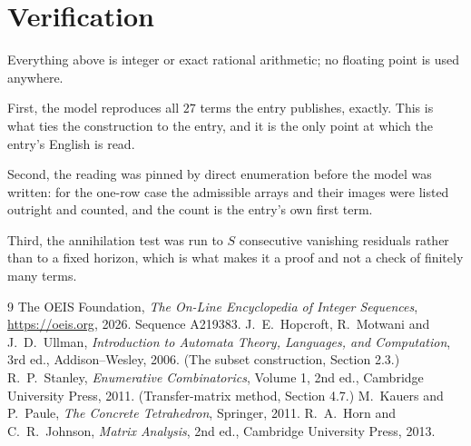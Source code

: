 \documentclass[11pt,a4paper]{article}
\theoremstyle{plain}
\theoremstyle{definition}
\begin{document}
\section{Verification}

Everything above is integer or exact rational arithmetic; no floating point is used anywhere.

First, the model reproduces all $27$ terms the entry publishes, exactly. This is what
ties the construction to the entry, and it is the only point at which the entry's English is
read.

Second, the reading was pinned by direct enumeration before the model was written: for the
one-row case the admissible arrays and their images were listed outright and counted, and the
count is the entry's own first term.

Third, the annihilation test was run to $S$ consecutive vanishing residuals rather than to a
fixed horizon, which is what makes it a proof and not a check of finitely many terms.

\begin{thebibliography}{9}
 The OEIS Foundation, \emph{The On-Line Encyclopedia of Integer
Sequences}, \url{https://oeis.org}, 2026. Sequence A219383.
 J.~E.~Hopcroft, R.~Motwani and J.~D.~Ullman, \emph{Introduction to Automata
Theory, Languages, and Computation}, 3rd ed., Addison--Wesley, 2006. (The subset
construction, Section 2.3.)
 R.~P.~Stanley, \emph{Enumerative Combinatorics}, Volume 1, 2nd ed.,
Cambridge University Press, 2011. (Transfer-matrix method, Section 4.7.)
 M.~Kauers and P.~Paule, \emph{The Concrete Tetrahedron}, Springer, 2011.
 R.~A.~Horn and C.~R.~Johnson, \emph{Matrix Analysis}, 2nd ed., Cambridge
University Press, 2013.
\end{thebibliography}
\end{document}
